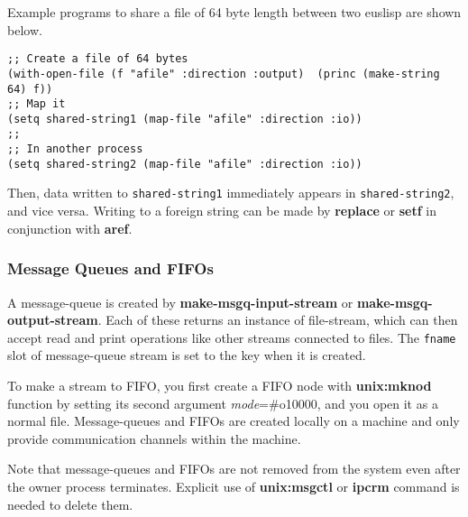 Example programs to share a file of 64 byte length between two
euslisp are shown below.

\begin{verbatim}
;; Create a file of 64 bytes
(with-open-file (f "afile" :direction :output)  (princ (make-string 64) f))
;; Map it
(setq shared-string1 (map-file "afile" :direction :io))
;;
;; In another process
(setq shared-string2 (map-file "afile" :direction :io))
\end{verbatim}

Then, data written to {\tt shared-string1}
immediately appears in {\tt shared-string2}, and vice versa.
Writing to a foreign string can be made by 
{\bf replace} or {\bf setf} in conjunction with {\bf aref}.

\begin{refdesc}
\end{refdesc}

\subsubsection{Message Queues and FIFOs}
A message-queue is created by {\bf make-msgq-input-stream} or {\bf make-msgq-output-stream}.
Each of these returns an instance of file-stream, which can then
accept read and print operations like other streams connected to files.
The {\tt fname} slot of message-queue stream is set to the key when it is
created.

To make a stream to FIFO,
you first create a FIFO node with {\bf unix:mknod} function
by setting its second argument {\em mode}=\#o10000,
and you open it as a normal file.
Message-queues and FIFOs are created locally on a machine and
only provide communication channels within the machine.

Note that message-queues and FIFOs are not removed from the system
even after the owner process terminates.
Explicit use of {\bf unix:msgctl} or {\bf ipcrm} command
is needed to delete them.

\begin{refdesc}


\end{refdesc}

